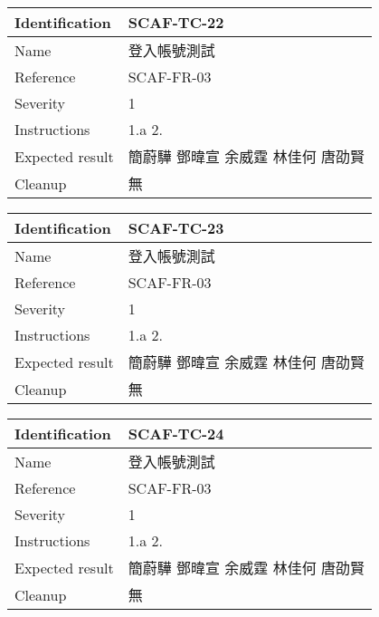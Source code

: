 \documentclass{report}
\begin{document}
\begin{tabularx}{0.9\textwidth}{
  |p{}%
  |p{}|%
  }
  \hline
  \centering Identification &  SCAF-TC-22 \\
  \hline
  \centering Name & 登入帳號測試 \\
  \hline
  \centering Reference & SCAF-FR-03 \\
  \hline
  \centering Severity & 1 \\
  \hline
  \centering Instructions & 1.a
                            2. \\
  \hline
  \centering Expected result & 簡蔚驊 \! 鄧暐宣 \! 余威霆 \! 林佳何 \! 唐劭賢 \\
  \hline
  \centering Cleanup & 無 \\
  \hline
\end{tabularx}
\newline\newline

\begin{tabularx}{0.9\textwidth}{
  |p{}%
  |p{}|%
  }
  \hline
  \centering Identification &  SCAF-TC-23 \\
  \hline
  \centering Name & 登入帳號測試 \\
  \hline
  \centering Reference & SCAF-FR-03 \\
  \hline
  \centering Severity & 1 \\
  \hline
  \centering Instructions & 1.a
                            2. \\
  \hline
  \centering Expected result & 簡蔚驊 \! 鄧暐宣 \! 余威霆 \! 林佳何 \! 唐劭賢 \\
  \hline
  \centering Cleanup & 無 \\
  \hline
\end{tabularx}
\newline\newline

\begin{tabularx}{0.9\textwidth}{
  |p{}%
  |p{}|%
  }
  \hline
  \centering Identification &  SCAF-TC-24 \\
  \hline
  \centering Name & 登入帳號測試 \\
  \hline
  \centering Reference & SCAF-FR-03 \\
  \hline
  \centering Severity & 1 \\
  \hline
  \centering Instructions & 1.a
                            2. \\
  \hline
  \centering Expected result & 簡蔚驊 \! 鄧暐宣 \! 余威霆 \! 林佳何 \! 唐劭賢 \\
  \hline
  \centering Cleanup & 無 \\
  \hline
\end{tabularx}
\newline\newline
\end{document}
